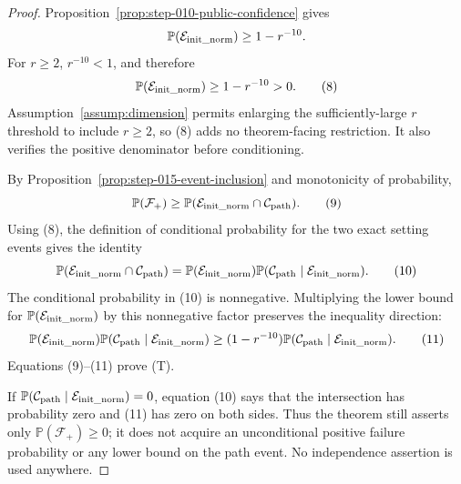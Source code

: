\begin{proof}
Proposition~\ref{prop:step-010-public-confidence} gives
\[
  \mathbb P(\mathcal E_{\rm init\_norm})\ge1-r^{-10}.
\]
For \(r\ge2\), \(r^{-10}<1\), and therefore
\[
  \mathbb P(\mathcal E_{\rm init\_norm})
  \ge1-r^{-10}>0.                                       \tag{8}
\]
Assumption~\ref{assump:dimension} permits enlarging the sufficiently-large
\(r\) threshold to include \(r\ge2\), so (8) adds no theorem-facing
restriction. It also verifies the positive denominator before conditioning.

By Proposition~\ref{prop:step-015-event-inclusion} and monotonicity of
probability,
\[
  \mathbb P(\mathcal F_+)
  \ge\mathbb P(\mathcal E_{\rm init\_norm}
    \cap\mathcal C_{\rm path}).                         \tag{9}
\]
Using (8), the definition of conditional probability for the two exact
setting events gives the identity
\[
  \mathbb P(\mathcal E_{\rm init\_norm}
    \cap\mathcal C_{\rm path})
  =\mathbb P(\mathcal E_{\rm init\_norm})
    \mathbb P(\mathcal C_{\rm path}
      \mid\mathcal E_{\rm init\_norm}).                 \tag{10}
\]
The conditional probability in (10) is nonnegative. Multiplying the lower bound for \(\mathbb P(\mathcal E_{\rm init\_norm})\) by this
nonnegative factor preserves the inequality direction:
\[
\begin{aligned}
  \mathbb P(\mathcal E_{\rm init\_norm})
    \mathbb P(\mathcal C_{\rm path}
      \mid\mathcal E_{\rm init\_norm})
  \ge(1-r^{-10})
    \mathbb P(\mathcal C_{\rm path}
      \mid\mathcal E_{\rm init\_norm}).
\end{aligned}\tag{11}
\]
Equations (9)--(11) prove (T).

If
\(\mathbb P(\mathcal C_{\rm path}\mid
\mathcal E_{\rm init\_norm})=0\), equation (10) says that the intersection
has probability zero and (11) has zero on both sides. Thus the theorem still
asserts only \(\mathbb P(\mathcal F_+)\ge0\); it does not acquire an
unconditional positive failure probability or any lower bound on the path
event. No independence assertion is used anywhere. 

\end{proof}

